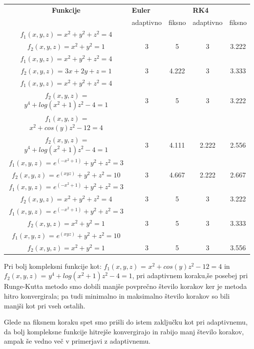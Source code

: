 \documentclass[]{article}
\begin{document}
\begin{tabular}{|c | c | c | c | c |} 
 \hline
 \textbf{Funkcije} &\multicolumn{2}{|l|}{\textbf{Euler}} &\multicolumn{2}{|l|}{\textbf{RK4}}\\                
  \small &adaptivno & fiksno & adaptivno & fiksno \\ 
 \hline
 \small{}$f_{1}(x,y,z)=x^{2} + y^{2}+ z^{2}=4$ & & & &\\ 
 \small{}$f_{2}(x,y,z)=x^{2} + y^{2}    =1$  & 3 & 5 & 3 & 3.222 \\
 \hline
 \small{}$f_{1}(x,y,z)=x^{2} + y^{2}+ z^{2}=4$ & & & &\\ 
 \small{}$f_{2}(x,y,z)$ = $3x + 2y + z = 1$  & 3 & 4.222 & 3 & 3.333 \\
 \hline
 \small{}$f_{1}(x,y,z)=x^{2} + y^{2}+ z^{2}=4$ & & & &\\ 
 \small{}$f_{2}(x,y,z)$ = $y^4 + log(x^2 + 1)z^2 - 4 = 1$  & 3 & 5 & 3 & 3.222 \\
 \hline
 \small{}$f_{1}(x,y,z)$ = $x^2 + cos(y)z^2 - 12 = 4$ & & & &\\ 
\small{}$f_{2}(x,y,z)$ = $y^4 + log(x^2 + 1)z^2 - 4 = 1$  & 3 & 4.111 & 2.222 & 2.556 \\
 \hline
 \small{}$f_{1}(x,y,z)$ = $e^{(-x^{2}+1)}+y^{2}+z^{2} = 3$ & & & &\\ 
 \small{}$f_{2}(x,y,z)$ = $e^{(xyz)}+y^{2}+z^{2} = 10$  & 3 & 4.667 & 2.222 & 2.667 \\
 \hline
 \small{}$f_{1}(x,y,z)$ = $e^{(-x^{2}+1)}+y^{2}+z^{2} = 3$ & & & &\\ 
 \small{}$f_{2}(x,y,z)=x^{2} + y^{2}+ z^{2}=4$  & 3 & 5 & 3 & 3.222 \\
 \hline
 \small{}$f_{1}(x,y,z)$ = $e^{(-x^{2}+1)}+y^{2}+z^{2} = 3$ & & & &\\ 
  \small{}$f_{2}(x,y,z)=x^{2} + y^{2}    =1$  & 3 & 5 & 3 & 3.333 \\
  \hline
\small{}$f_{1}(x,y,z)$ = $e^{(xyz)}+y^{2}+z^{2} = 10$ & & & &\\ 
 \small{}$f_{2}(x,y,z)=x^{2} + y^{2}    =1$  & 3 & 5 & 3 & 3.556 \\
  \hline
\end{tabular} \par
Pri bolj kompleksni funkcije kot: $f_{1}(x,y,z)$ = $x^2 + cos(y)z^2 - 12 = 4$  in $f_{2}(x,y,z)$ = $y^4 + log(x^2 + 1)z^2 - 4 = 1$, pri adaptivnem koraku,\v{s}e posebej pri Runge-Kutta metodo smo dobili manj\v{s}e povpre\v{c}no \v{s}tevilo korakov ker je metoda hitro konvergirala; pa tudi minimalno in maksimalno \v{s}tevilo korakov so bili manj\v{s}i kot pri vseh ostalih.\par
Glede na fiksnem koraku spet smo pri\v{s}li do istem zaklju\v{c}ku kot pri adaptivnemu, da bolj kompleksne funkcije hitrej\v{s}e konvergirajo in rabijo manj \v{s}tevilo korakov, ampak \v{s}e vedno ve\v{c} v primerjavi z adaptivnemu. 
\end{document}
